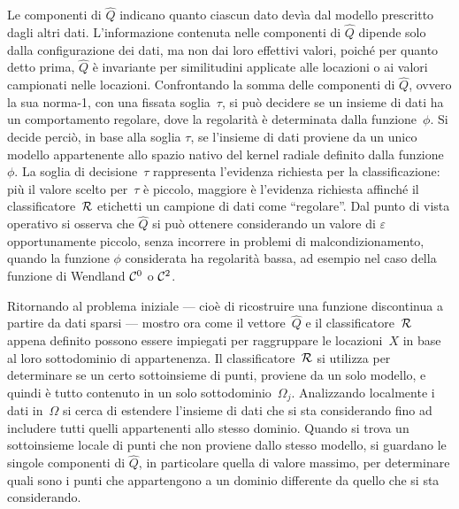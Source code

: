 Le componenti di $\widehat Q$ indicano quanto ciascun dato devìa dal modello prescritto dagli altri dati.  L’informazione contenuta nelle componenti di $\widehat Q$  dipende solo dalla configurazione dei dati, ma non dai loro effettivi valori, poiché per quanto detto prima, $\widehat Q$ è invariante per similitudini applicate alle locazioni o ai valori campionati nelle locazioni.
Confrontando la somma delle componenti di $\widehat Q$, ovvero la sua norma-1, con una fissata soglia~$\tau$, si può decidere se un insieme di dati ha un comportamento regolare, dove la regolarità è determinata dalla funzione~$\phi$.  Si decide perciò, in base alla soglia $\tau$, se l’insieme di dati proviene da un unico modello appartenente allo spazio nativo del kernel radiale definito dalla funzione~$\phi$. 
 La soglia di decisione~$\tau$ rappresenta l’evidenza richiesta per la classificazione:  più il valore scelto per~$\tau$ è piccolo, maggiore è l’evidenza richiesta affinché il classificatore~$\cal R$ etichetti un campione di dati come “regolare”.
Dal punto di vista operativo si osserva che $\widehat Q$ si può ottenere considerando un valore di $\varepsilon$ opportunamente piccolo, senza incorrere in problemi di malcondizionamento, quando la funzione $\phi$ considerata ha regolarità bassa, ad esempio nel caso della funzione di Wendland ${\cal C}^0$ o ${\cal C}^2$.


Ritornando al problema iniziale --- cioè di ricostruire una funzione discontinua a partire da dati sparsi --- mostro ora come il vettore~$\widehat Q$ e il classificatore~$\cal R$ appena definito possono essere impiegati per raggruppare le locazioni~$X$ in base al loro sottodominio di appartenenza.
Il classificatore~$\cal R$ si utilizza per determinare se un certo sottoinsieme di punti,  proviene da un solo modello, e quindi è tutto contenuto in un solo sottodominio~$\Omega_j$.
Analizzando localmente i dati in~$\Omega$ si cerca di estendere l’insieme di dati che si sta considerando fino ad includere tutti quelli appartenenti allo stesso dominio.
Quando si trova un sottoinsieme locale di punti che non proviene dallo stesso modello, si guardano le singole componenti di $\widehat Q$, in particolare quella di valore massimo, per determinare quali sono i punti che appartengono a un dominio differente da quello che si sta considerando.


